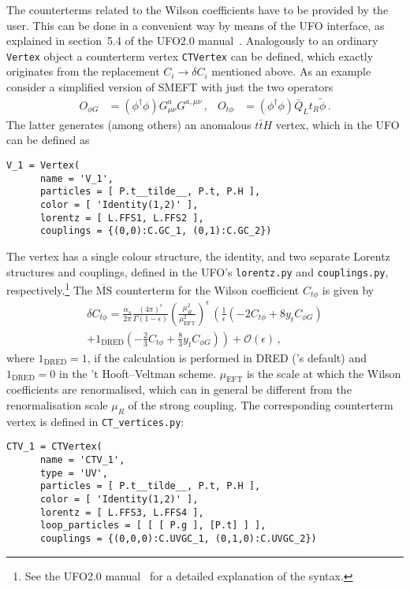 The counterterms related to the Wilson coefficients have to be provided by the user. This can be done in a convenient way by means of the UFO interface, as explained in section~5.4 of the UFO2.0 manual~\cite{Darme:2023jdn}. Analogously to an ordinary \texttt{Vertex} object a counterterm vertex \texttt{CTVertex} can be defined, which exactly originates from the replacement $C_i\to \delta C_i$ mentioned above. As an example consider a simplified version of SMEFT with just the two operators 
\begin{align}
    O_{\phi G} &= \left(\phi^\dagger\phi\right)G_{\mu\nu}^aG^{a,\mu\nu}\,, & O_{t\phi} &= \left(\phi^\dagger\phi\right)\bar{Q}_Lt_R\tilde{\phi}\,.
\end{align}    
The latter generates (among others) an anomalous $t\bar{t}H$ vertex, which in the UFO can be defined as
\begin{lstlisting}[gobble=3, style=py]
   V_1 = Vertex(
      name = 'V_1',
      particles = [ P.t__tilde__, P.t, P.H ],
      color = [ 'Identity(1,2)' ],
      lorentz = [ L.FFS1, L.FFS2 ],
      couplings = {(0,0):C.GC_1, (0,1):C.GC_2})
\end{lstlisting}
The vertex has a single colour structure, the identity, and two separate Lorentz structures and couplings, defined in the UFO's \texttt{lorentz.py} and \texttt{couplings.py}, respectively.\footnote{See the UFO2.0 manual~\cite{Darme:2023jdn} for a detailed explanation of the syntax.} The $\overline{\text{MS}}$ counterterm for the Wilson coefficient $C_{t\phi}$ is given by
\begin{multline}\label{eq:Ctphi_CT}
   \delta C_{t\phi} = \frac{\alpha_s}{2\pi}\frac{(4\pi)^\epsilon}{\Gamma(1-\epsilon)}\left(\frac{\mu_R^2}{\mu_\mathrm{EFT}^2}\right)^\epsilon\,\left(\frac{1}{\epsilon}\left(-2C_{t\phi}+8y_tC_{\phi G}\right)\right. \\+ \left.1_\mathrm{DRED}\left(-\frac{2}{3}C_{t\phi}+\frac{8}{3}y_tC_{\phi G}\right)\right) + \mathcal{O}(\epsilon)\,,
\end{multline}
where $1_\mathrm{DRED}=1$, if the calculation is performed in DRED (\gosam's default) and $1_\mathrm{DRED}=0$ in the 't Hooft--Veltman scheme. $\mu_\mathrm{EFT}$ is the scale at which the Wilson coefficients are renormalised, which can in general be different from the renormalisation scale $\mu_R$ of the strong coupling. The corresponding counterterm vertex is defined in \texttt{CT\_vertices.py}:
\begin{lstlisting}[gobble=3, style=py]
   CTV_1 = CTVertex(
      name = 'CTV_1',
      type = 'UV',
      particles = [ P.t__tilde__, P.t, P.H ],
      color = [ 'Identity(1,2)' ],
      lorentz = [ L.FFS3, L.FFS4 ],
      loop_particles = [ [ [ P.g ], [P.t] ] ],
      couplings = {(0,0,0):C.UVGC_1, (0,1,0):C.UVGC_2})
\end{lstlisting}
